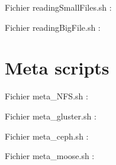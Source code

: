 \documentclass[12pt]{report}
\begin{document}
				Fichier readingSmallFiles.sh :
				

				Fichier readingBigFile.sh :
				
			\section{Meta scripts}
				Fichier meta\_NFS.sh :
				

				Fichier meta\_gluster.sh :
				

				Fichier meta\_ceph.sh :
				

				Fichier meta\_moose.sh :
				
\end{document}
